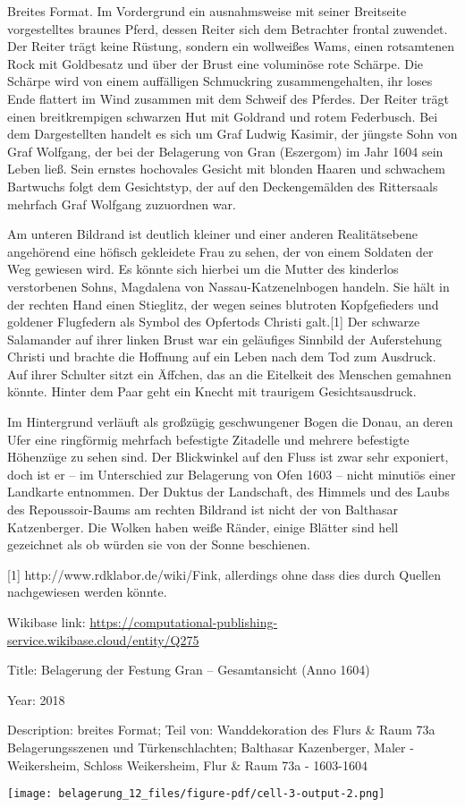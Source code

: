 \documentclass[
  a4paper,
  portrait]{book}
\begin{document}
Breites Format. Im Vordergrund ein ausnahmsweise mit seiner Breitseite
vorgestelltes braunes Pferd, dessen Reiter sich dem Betrachter frontal
zuwendet. Der Reiter trägt keine Rüstung, sondern ein wollweißes Wams,
einen rotsamtenen Rock mit Goldbesatz und über der Brust eine voluminöse
rote Schärpe. Die Schärpe wird von einem auffälligen Schmuckring
zusammengehalten, ihr loses Ende flattert im Wind zusammen mit dem
Schweif des Pferdes. Der Reiter trägt einen breitkrempigen schwarzen Hut
mit Goldrand und rotem Federbusch. Bei dem Dargestellten handelt es sich
um Graf Ludwig Kasimir, der jüngste Sohn von Graf Wolfgang, der bei der
Belagerung von Gran (Eszergom) im Jahr 1604 sein Leben ließ. Sein
ernstes hochovales Gesicht mit blonden Haaren und schwachem Bartwuchs
folgt dem Gesichtstyp, der auf den Deckengemälden des Rittersaals
mehrfach Graf Wolfgang zuzuordnen war.

Am unteren Bildrand ist deutlich kleiner und einer anderen
Realitätsebene angehörend eine höfisch gekleidete Frau zu sehen, der von
einem Soldaten der Weg gewiesen wird. Es könnte sich hierbei um die
Mutter des kinderlos verstorbenen Sohns, Magdalena von
Nassau-Katzenelnbogen handeln. Sie hält in der rechten Hand einen
Stieglitz, der wegen seines blutroten Kopfgefieders und goldener
Flugfedern als Symbol des Opfertods Christi galt.{[}1{]} Der schwarze
Salamander auf ihrer linken Brust war ein geläufiges Sinnbild der
Auferstehung Christi und brachte die Hoffnung auf ein Leben nach dem Tod
zum Ausdruck. Auf ihrer Schulter sitzt ein Äffchen, das an die Eitelkeit
des Menschen gemahnen könnte. Hinter dem Paar geht ein Knecht mit
traurigem Gesichtsausdruck.

Im Hintergrund verläuft als großzügig geschwungener Bogen die Donau, an
deren Ufer eine ringförmig mehrfach befestigte Zitadelle und mehrere
befestigte Höhenzüge zu sehen sind. Der Blickwinkel auf den Fluss ist
zwar sehr exponiert, doch ist er -- im Unterschied zur Belagerung von
Ofen 1603 -- nicht minutiös einer Landkarte entnommen. Der Duktus der
Landschaft, des Himmels und des Laubs des Repoussoir-Baums am rechten
Bildrand ist nicht der von Balthasar Katzenberger. Die Wolken haben
weiße Ränder, einige Blätter sind hell gezeichnet als ob würden sie von
der Sonne beschienen.

{[}1{]} http://www.rdklabor.de/wiki/Fink, allerdings ohne dass dies
durch Quellen nachgewiesen werden könnte.

Wikibase link:
\url{https://computational-publishing-service.wikibase.cloud/entity/Q275}

Title: Belagerung der Festung Gran -- Gesamtansicht (Anno 1604)

Year: 2018

Description: breites Format; Teil von: Wanddekoration des Flurs \& Raum
73a Belagerungsszenen und Türkenschlachten; Balthasar Kazenberger, Maler
- Weikersheim, Schloss Weikersheim, Flur \& Raum 73a - 1603-1604

\texttt{[image: belagerung\_12\_files/figure-pdf/cell-3-output-2.png]}


\backmatter
\end{document}
